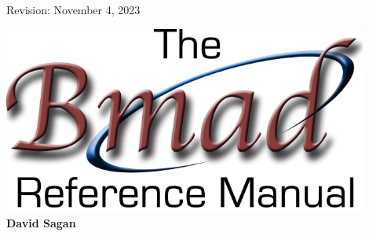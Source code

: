 
\thispagestyle{empty}

\begin{flushright}
\large
  Revision: November 4, 2023 \\
\end{flushright}


\vfill

{
\begin{center}
\includegraphics[width=12cm]{bmad-ref-manual.pdf} \\
\vskip 0.3in
\huge\bf David Sagan
\end{center}
}

\vfill
\break
